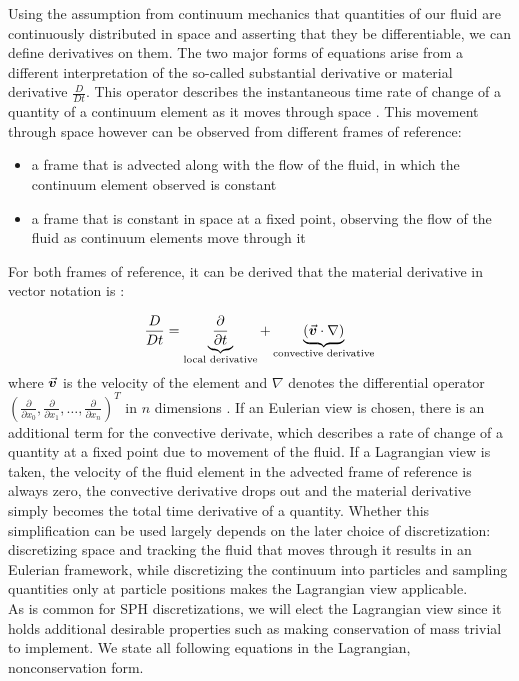 Using the assumption from continuum mechanics that quantities of our fluid are continuously distributed in space and asserting that they be differentiable, we can define derivatives on them. The two major forms of equations arise from a different interpretation of the so-called substantial derivative\autocite*{anderson} or material derivative\autocite*{tutorial} $\frac{D}{Dt}$. This operator describes the instantaneous time rate of change of a quantity of a continuum element as it moves through space \autocite*{anderson}. This movement through space however can be observed from different frames of reference:
\begin{itemize}
  \item a frame that is advected along with the flow of the fluid, in which the continuum element observed is constant
  \item a frame that is constant in space at a fixed point, observing the flow of the fluid as continuum elements move through it
\end{itemize}

For both frames of reference, it can be derived that the material derivative in vector notation is \autocite*{anderson}:

\begin{align}
  \frac{D}{Dt} = \underbrace{\frac{\partial }{\partial t}}_{\text{local derivative}} + \underbrace{(\vec{\bm{v}}\cdot \nabla)}_{\text{convective derivative}}
\end{align}
where $\vec{\bm{v}}$ is the velocity of the element and $\nabla$ denotes the differential operator $\left(\frac{\partial}{\partial x_0}, \frac{\partial}{\partial x_1}, \dots,  \frac{\partial}{\partial x_n}\right)^T$ in $n$ dimensions \autocite*{anderson}. If an Eulerian view is chosen, there is an additional term for the convective derivate, which describes a rate of change of a quantity at a fixed point due to movement of the fluid. If a Lagrangian view is taken, the velocity of the fluid element in the advected frame of reference is always zero, the convective derivative drops out and the material derivative simply becomes the total time derivative of a quantity.
Whether this simplification can be used largely depends on the later choice of discretization: discretizing space and tracking the fluid that moves through it results in an Eulerian framework, while discretizing the continuum into particles and sampling quantities only at particle positions makes the Lagrangian view applicable.\\
As is common for SPH discretizations, we will elect the Lagrangian view since it holds additional desirable properties such as making conservation of mass trivial to implement. We state all following equations in the Lagrangian, nonconservation form.


